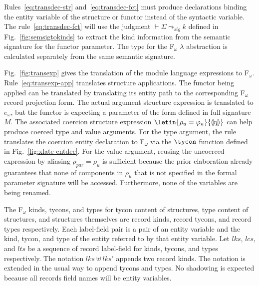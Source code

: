 \documentclass[9pt,nocopyrightspace, fleqn]{sigplanconf}
\begin{document}

Rules~\ref{eq:transdec-str}
and~\ref{eq:transdec-fct} must produce declarations binding the entity
variable of the structure or functor instead of the syntactic
variable. %
The rule~\ref{eq:transdec-fct} will use the judgment $\vdash \Sigma
\leadsto_{sig} k$ defined in Fig.~\ref{fig:semsigtokinds} to extract
the kind information from the semantic signature for the functor
parameter. The type for the F$_\omega$ $\lambda$ abstraction is
calculated separately from the same semantic signature. 

Fig.~\ref{fig:transexp} gives the translation of the module
language expressions to F$_\omega$. Rule~\ref{eq:transexp-app} translates
structure applications. The functor being applied can be translated by
translating its entity path to the corresponding F$_\omega$ record
projection form. The actual argument structure expression is
translated to $e_\omega$, but the functor is expecting a parameter of
the form defined in full signature $M$. The associated coercion
structure expression $\letin{\rho_u=\varphi_u}{\llparenthesis \eta
  \rrparenthesis}$ can help produce coerced type and value
arguments. For the type argument, the rule translates the coercion entity
declaration to F$_\omega$ via the $\tycon$ function defined in
Fig.~\ref{fig:xlate-entdec}. For the value argument, reusing the
uncoerced expression by aliasing $\rho_{par} = \rho_u$ is sufficient
because the prior elaboration already guarantees that none of
components in $\rho_u$ that is not specified in the formal parameter
signature will be accessed. Furthermore, none of the variables are
being renamed. 

The F$_\omega$ kinds, tycons, and types for tycon content of structures, type
content of structures, and structures themselves are record kinds,
record tycons, and record types respectively. Each label-field pair is
a pair of an entity variable and the kind, tycon, and type of the
entity referred to by that entity variable. Let $lks$, $lcs$, and $lts$ be a sequence of record label-field for
kinds, tycons, and types respectively. The notation
$lks\uplus lks'$ appends two record kinds. The notation is extended in
the usual way to append tycons and types. No shadowing is expected
because all records field names will be entity variables. 
\end{document}
